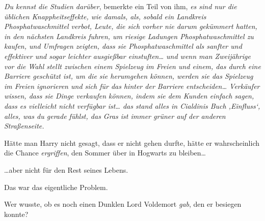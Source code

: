\emph{Du kennst die \emph{Studien} darüber}, bemerkte ein Teil von ihm, \emph{es sind nur die üblichen Knappheitseffekte, wie damals, als, sobald ein Landkreis Phosphatwaschmittel verbot, Leute, die sich vorher nie darum gekümmert hatten, in den nächsten Landkreis fuhren, um riesige Ladungen Phosphatwaschmittel zu kaufen, und Umfragen zeigten, dass sie Phosphatwaschmittel als sanfter und effektiver und sogar leichter ausgießbar einstuften… und wenn man Zweijährige vor die Wahl stellt zwischen einem Spielzeug im Freien und einem, das durch eine Barriere geschützt ist, um die sie herumgehen können, werden sie das Spielzeug im Freien ignorieren und sich für das hinter der Barriere entscheiden… Verkäufer wissen, dass sie Dinge verkaufen können, indem sie dem Kunden einfach sagen, dass es vielleicht nicht verfügbar ist… das stand alles in Cialdinis Buch ‚Einfluss‘, alles, was du gerade fühlst, das Gras ist immer grüner auf der anderen Straßenseite.}

Hätte man Harry nicht gesagt, dass er nicht gehen durfte, hätte er wahrscheinlich die Chance \emph{ergriffen}, den Sommer über in Hogwarts zu bleiben…

…aber nicht für den Rest seines Lebens.

Das war das eigentliche Problem.

Wer wusste, ob es noch einen Dunklen Lord Voldemort \emph{gab}, den er besiegen konnte?

